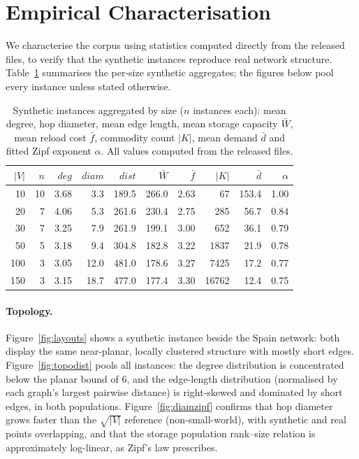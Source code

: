 \documentclass[runningheads]{llncs}
\begin{document}
\section{Empirical Characterisation}
\label{sec:char}

We characterise the corpus using statistics computed directly from the released
files, to verify that the synthetic instances reproduce real network structure.
Table~\ref{tab:syn} summarises the per-size synthetic aggregates; the figures
below pool every instance unless stated otherwise.

\begin{table}[t]
\centering
\caption{Synthetic instances aggregated by size ($n$ instances each): mean
degree, hop diameter, mean edge length, mean storage capacity $\bar W$, mean
reload cost $\bar f$, commodity count $|K|$, mean demand $\bar d$ and fitted Zipf
exponent $\alpha$. All values computed from the released files.}
\label{tab:syn}
\setlength{\tabcolsep}{6pt}
\begin{tabular}{rrrrrrrrrr}
\toprule
$|V|$ & $n$ & $deg$ & $diam$ & $dist$ & $\bar W$ & $\bar f$ & $|K|$ & $\bar d$ & $\alpha$\\
\midrule
10  & 10 & 3.68 & 3.3  & 189.5 & 266.0 & 2.63 & 67    & 153.4 & 1.00\\
20  & 7  & 4.06 & 5.3  & 261.6 & 230.4 & 2.75 & 285   & 56.7  & 0.84\\
30  & 7  & 3.25 & 7.9  & 261.9 & 199.1 & 3.00 & 652   & 36.1  & 0.79\\
50  & 5  & 3.18 & 9.4  & 304.8 & 182.8 & 3.22 & 1837  & 21.9  & 0.78\\
100 & 3  & 3.05 & 12.0 & 481.0 & 178.6 & 3.27 & 7425  & 17.2  & 0.77\\
150 & 3  & 3.15 & 18.7 & 477.0 & 177.4 & 3.30 & 16762 & 12.4  & 0.75\\
\bottomrule
\end{tabular}
\end{table}

\paragraph{Topology.}
Figure~\ref{fig:layouts} shows a synthetic instance beside the Spain network:
both display the same near-planar, locally clustered structure with mostly short
edges. Figure~\ref{fig:topodist} pools all instances: the degree distribution is
concentrated below the planar bound of $6$, and the edge-length distribution
(normalised by each graph's largest pairwise distance) is right-skewed and
dominated by short edges, in both populations. Figure~\ref{fig:diamzipf} confirms
that hop diameter grows faster than the $\sqrt{|V|}$ reference (non-small-world),
with synthetic and real points overlapping, and that the storage population
rank--size relation is approximately log-linear, as Zipf's law prescribes.
\end{document}
